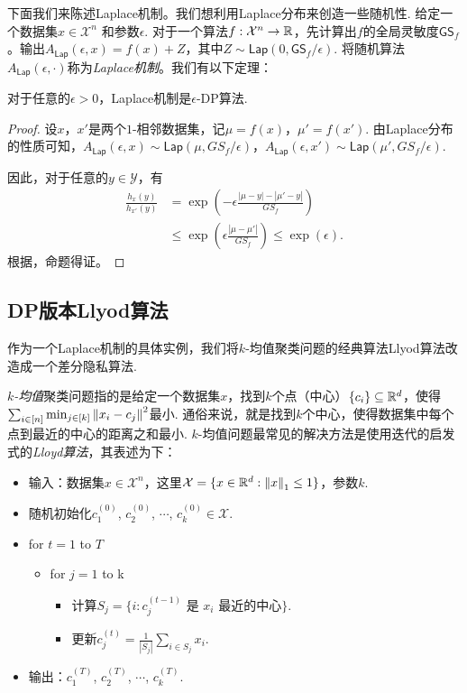 下面我们来陈述Laplace机制。我们想利用Laplace分布来创造一些随机性. 给定一个数据集$x \in \mathcal X^n$ 和参数$\epsilon$. 对于一个算法$f:\mathcal X^n \to \mathbb{R}$，先计算出$f$的全局灵敏度$\mathsf{GS}_f$。输出$A_{\mathsf{Lap}}(\epsilon, x) = f(x) + Z$，其中$Z\sim \mathsf{Lap}(0, \mathsf{GS}_f/\epsilon)$. 将随机算法$A_{\mathsf{Lap}}(\epsilon, \cdot)$称为\emph{Laplace机制}。我们有以下定理：
\begin{theorem}\label{thm:laplace-mechanism}
    对于任意的$\epsilon > 0$，Laplace机制是$\epsilon$-DP算法.
\end{theorem}
\begin{proof}
设$x$，$x'$是两个$1$-相邻数据集，记$\mu = f(x)$，$\mu' = f(x')$. 由Laplace分布的性质可知，$A_{\mathsf{Lap}}(\epsilon, x) \sim \mathsf{Lap}(\mu, GS_f/\epsilon)$，$A_{\mathsf{Lap}}(\epsilon, x') \sim \mathsf{Lap}(\mu', GS_f/\epsilon)$.

因此，对于任意的$y \in \mathcal Y$，有
    \[
    \begin{aligned}
        \frac{h_{x}(y)}{h_{x'}(y)} &=\exp \left(-\epsilon \frac{|\mu - y| - |\mu' - y|}{GS_f} \right) \\
        &\leq \exp \left(\epsilon \frac{|\mu - \mu'|}{GS_f} \right)\leq \exp(\epsilon).
    \end{aligned}
    \]
根据，命题得证。
\end{proof}

\subsection{DP版本Llyod算法}
作为一个Laplace机制的具体实例，我们将$k$-均值聚类问题的经典算法Llyod算法改造成一个差分隐私算法.

\emph{$k$-均值}聚类问题指的是给定一个数据集$x$，找到$k$个点（中心）$\{c_i\} \subseteq \mathbb{R}^d$，使得$\sum_{i \in [n]} \min_{j\in[k]} \left\|x_i - c_j\right\|^2$最小. 通俗来说，就是找到$k$个中心，使得数据集中每个点到最近的中心的距离之和最小. $k$-均值问题最常见的解决方法是使用迭代的启发式的\emph{Lloyd算法}，其表述为下：
\begin{itemize}
    \item 输入：数据集$x \in \mathcal X^n$，这里$\mathcal X = \{x \in \mathbb{R}^d : \left\|x\right\|_1 \leq 1 \}$，参数$k$.
    \item 随机初始化$c_1^{(0)}$, $c_2^{(0)}$, $\cdots$, $c_k^{(0)} \in \mathcal X$.
    \item for $t=1$ to $T$
    \begin{itemize}
        \item for $j=1$ to k
        \begin{itemize}
            \item 计算$S_j = \{i : c_{j}^{(t-1)} \text{ 是\ } x_i \text{ 最近的中心}\}$.
            \item 更新$c_j^{(t)} = \frac1{|S_j|}\sum_{i\in S_j} x_i$.
        \end{itemize}
    \end{itemize}
    \item 输出：$c_1^{(T)}$, $c_2^{(T)}$, $\cdots$, $c_k^{(T)}$.
\end{itemize}

